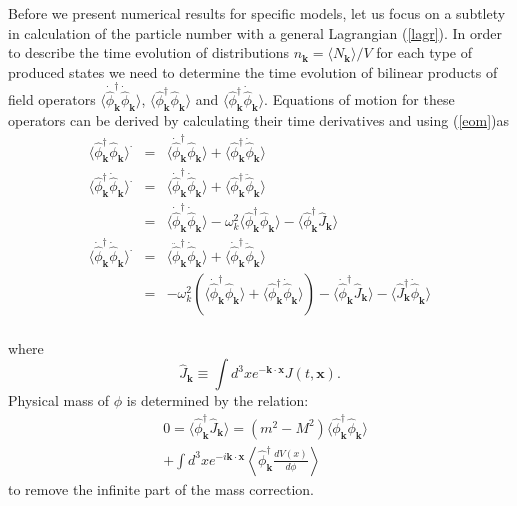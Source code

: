\documentclass[twocolumn,showpacs,preprintnumbers,amsmath,amssymb,nofootinbib,superscriptaddress,prc]{revtex4}
\begin{document}
Before we present numerical results for specific models, let us focus on a subtlety in calculation of the particle number with a general Lagrangian (\ref{lagr}). In order to describe the time evolution of distributions $n_{\textbf{k}} = \langle N_{\textbf{k}} \rangle/V$ for each type of produced states we need to determine the time evolution of bilinear products of field operators $ \langle \dot{\hat{\phi}}_{\textbf{k}}^{\dagger} \dot{\hat{\phi}}_{\textbf{k}} \rangle $, $ \langle \hat{\phi}_{\textbf{k}}^{\dagger} \hat{\phi}_{\textbf{k}} \rangle $ and $ \langle \hat{\phi}_{\textbf{k}}^{\dagger} \dot{\hat{\phi}}_{\textbf{k}} \rangle $. Equations of motion for these operators can be derived by calculating their time derivatives and using (\ref{eom})as
\begin{eqnarray}
 \langle \hat{\phi}_{\textbf{k}}^{\dagger} \hat{\phi}_{\textbf{k}} \rangle^{\cdot}
  &=& \langle \dot{\hat{\phi}}_{\textbf{k}}^{\dagger}\hat{\phi}_{\textbf{k}} \rangle + \langle \hat{\phi}_{\textbf{k}}^{\dagger} \dot{\hat{\phi}}_{\textbf{k}} \rangle \label{eq:pp_d}\\
 \langle \hat{\phi}_{\textbf{k}}^{\dagger} \dot{\hat{\phi}}_{\textbf{k}} \rangle^{\cdot}
  &=& \langle \dot{\hat{\phi}}_{\textbf{k}}^{\dagger} \dot{\hat{\phi}}_{\textbf{k}} \rangle + \langle \hat{\phi}_{\textbf{k}}^{\dagger} \ddot{\hat{\phi}}_{\textbf{k}} \rangle \nonumber \\
  &=& \langle \dot{\hat{\phi}}_{\textbf{k}}^{\dagger} \dot{\hat{\phi}}_{\textbf{k}} \rangle - \omega_k^2 \langle \hat{\phi}_{\textbf{k}}^{\dagger} \hat{\phi}_{\textbf{k}} \rangle - \langle \hat{\phi}_{\textbf{k}}^{\dagger} \hat{J}_{\textbf{k}} \rangle \label{eq:pd_d}\\
 \langle \dot{\hat{\phi}}_{\textbf{k}}^{\dagger} \dot{\hat{\phi}}_{\textbf{k}} \rangle^{\cdot}
  &=& \langle \ddot{\hat{\phi}}_{\textbf{k}}^{\dagger}\dot{\hat{\phi}}_{\textbf{k}} \rangle + \langle \dot{\hat{\phi}}_{\textbf{k}}^{\dagger} \ddot{\hat{\phi}}_{\textbf{k}} \rangle \nonumber \\
  &=& -\omega_k^2(\langle \dot{\hat{\phi}}_{\textbf{k}}^{\dagger} \hat{\phi}_{\textbf{k}} \rangle + \langle \hat{\phi}_{\textbf{k}}^{\dagger}\dot{\hat{\phi}}_{\textbf{k}} \rangle)  -\langle \dot{\hat{\phi}}_{\textbf{k}}^{\dagger} \hat{J}_{\textbf{k}} \rangle - \langle \hat{J}_{\textbf{k}}^{\dagger}\dot{\hat{\phi}}_{\textbf{k}} \rangle \nonumber \label{eq:dd_d}\\
\end{eqnarray}

where
\begin{equation}
\hat{J}_{\textbf{k}} \equiv \int d^3 x e^{- \textbf{k} \cdot \textbf{x}} J(t, \textbf{x}).
\end{equation}
Physical mass of $\phi$ is determined by the relation:
\begin{eqnarray}
& 0 = \langle \hat{\phi}_{\textbf{k}}^{\dagger} \hat{J}_{\textbf{k}} \rangle = (m^2 - M^2) \langle \hat{\phi}_{\textbf{k}}^\dagger \hat{\phi}_{\textbf{k}} \rangle \\
& \nonumber + \int d^3 x e^{-i \mathbf{k\cdot x}} \left \langle \hat{\phi}_{\textbf{k}}^\dagger \frac{dV(x)}{ d\phi} \right \rangle
\end{eqnarray}
to remove the infinite part of the mass correction.
\end{document}
